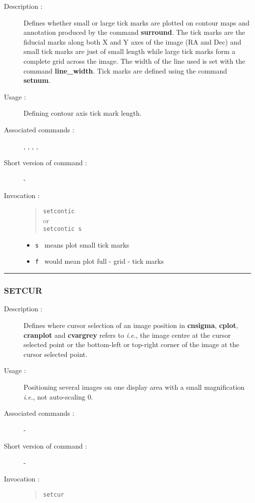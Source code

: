 \begin{description}

\item[Description :] Defines whether small or large tick marks are
plotted on contour maps and annotation produced by the command {\bf
surround}.  The tick marks are the fiducial marks along both X and Y
axes of the image (RA and Dec) and small tick marks are just of small
length while large tick marks form a complete grid across the image.
The width of the line used is set with the command {\bf line\_width}.
Tick marks are defined using the command {\bf setnum}.

\item[Usage :] Defining contour axis tick mark length.

\item[Associated commands :] {\tt {}}, 
{\tt {}}, {\tt {}}, 
{\tt {}}, {\tt {}}

\item[Short version of command :] -
\item[Invocation :]

\begin{quote}{\tt  setcontic }\\
or \\
{\tt setcontic s }
\end{quote}

\begin{itemize}
\item {\tt s } means plot small tick marks
\item {\tt f } would mean plot full - grid - tick marks
\end{itemize}

\end{description}

\hrule 
\subsubsection*{\label{SETCUR}SETCUR}

\begin{description}

\item[Description :] Defines where cursor selection of an image
position in {\bf cnsigma}, {\bf cplot}, {\bf cranplot} and {\bf
cvargrey} refers to \emph{i.e.}, the image centre at the cursor
selected point or the bottom-left or top-right corner of the image at
the cursor selected point.

\item[Usage :] Positioning several images on one display
area with a small magnification \emph{i.e.}, not auto-scaling 0.

\item[Associated commands :] -
\item[Short version of command :] -
\item[Invocation :]

\begin{quote}{\tt  setcur }\end{quote}

\end{description}


